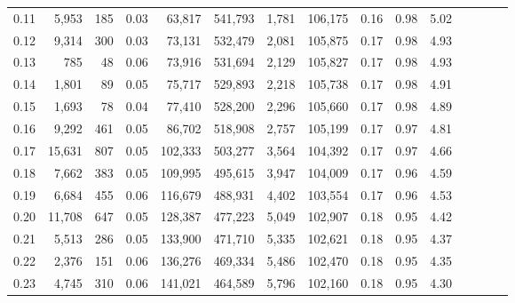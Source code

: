 \begin{tabular}{rrrcrrrrrrrrrrr}
0.11 &   5,953 &    185 &                                       0.03 &   63,817 &  541,793 &    1,781 &  106,175 &  0.16 &  0.98 &                         5.02 \\
0.12 &   9,314 &    300 &                                       0.03 &   73,131 &  532,479 &    2,081 &  105,875 &  0.17 &  0.98 &                         4.93 \\
0.13 &     785 &     48 &                                       0.06 &   73,916 &  531,694 &    2,129 &  105,827 &  0.17 &  0.98 &                         4.93 \\
0.14 &   1,801 &     89 &                                       0.05 &   75,717 &  529,893 &    2,218 &  105,738 &  0.17 &  0.98 &                         4.91 \\
0.15 &   1,693 &     78 &                                       0.04 &   77,410 &  528,200 &    2,296 &  105,660 &  0.17 &  0.98 &                         4.89 \\
0.16 &   9,292 &    461 &                                       0.05 &   86,702 &  518,908 &    2,757 &  105,199 &  0.17 &  0.97 &                         4.81 \\
0.17 &  15,631 &    807 &                                       0.05 &  102,333 &  503,277 &    3,564 &  104,392 &  0.17 &  0.97 &                         4.66 \\
0.18 &   7,662 &    383 &                                       0.05 &  109,995 &  495,615 &    3,947 &  104,009 &  0.17 &  0.96 &                         4.59 \\
0.19 &   6,684 &    455 &                                       0.06 &  116,679 &  488,931 &    4,402 &  103,554 &  0.17 &  0.96 &                         4.53 \\
0.20 &  11,708 &    647 &                                       0.05 &  128,387 &  477,223 &    5,049 &  102,907 &  0.18 &  0.95 &                         4.42 \\
0.21 &   5,513 &    286 &                                       0.05 &  133,900 &  471,710 &    5,335 &  102,621 &  0.18 &  0.95 &                         4.37 \\
0.22 &   2,376 &    151 &                                       0.06 &  136,276 &  469,334 &    5,486 &  102,470 &  0.18 &  0.95 &                         4.35 \\
0.23 &   4,745 &    310 &                                       0.06 &  141,021 &  464,589 &    5,796 &  102,160 &  0.18 &  0.95 &                         4.30 \\

\end{tabular}
